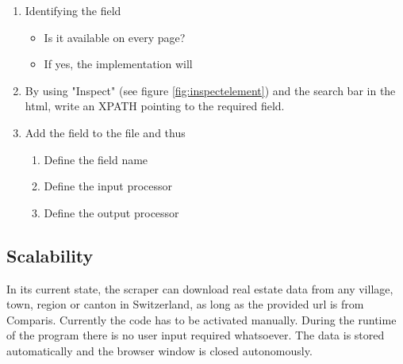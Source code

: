 \documentclass[main]{subfiles}
\begin{document}
\begin{enumerate}
    \item Identifying the field
    \begin{itemize}
        \item Is it available on every page?
        \item If yes, the implementation will 
    \end{itemize}
    \item By using "Inspect" (see figure \ref{fig:inspectelement}) and the search bar in the \acs*{html}, write an XPATH pointing to the required field.
    \item Add the field to the \pkg[items.py] file and thus
    \begin{enumerate}
        \item Define the field name
        \item Define the input processor
        \item Define the output processor
    \end{enumerate}
\end{enumerate}


\subsection{Scalability}
In its current state, the scraper can download real estate data from any village, town, region or canton in Switzerland,
as long as the provided \acs*{url} is from Comparis.
Currently the code has to be activated manually.
During the runtime of the program there is no user input required whatsoever.
The data is stored automatically and the browser window is closed autonomously.
\end{document}
